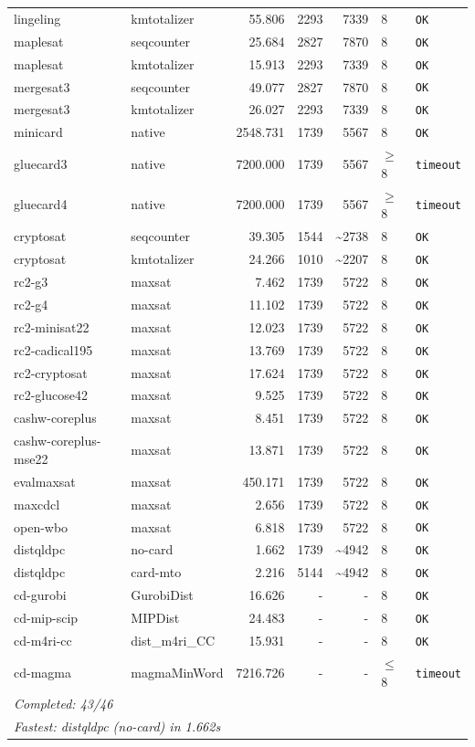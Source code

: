 \begin{longtable}{llrrrl p{}}
lingeling & kmtotalizer & 55.806 & 2293 & 7339 & 8 & \texttt{OK} \\
maplesat & seqcounter & 25.684 & 2827 & 7870 & 8 & \texttt{OK} \\
maplesat & kmtotalizer & 15.913 & 2293 & 7339 & 8 & \texttt{OK} \\
mergesat3 & seqcounter & 49.077 & 2827 & 7870 & 8 & \texttt{OK} \\
mergesat3 & kmtotalizer & 26.027 & 2293 & 7339 & 8 & \texttt{OK} \\
minicard & native & 2548.731 & 1739 & 5567 & 8 & \texttt{OK} \\
gluecard3 & native & 7200.000 & 1739 & 5567 & $\geq$8 & \texttt{timeout} \\
gluecard4 & native & 7200.000 & 1739 & 5567 & $\geq$8 & \texttt{timeout} \\
cryptosat & seqcounter & 39.305 & 1544 & \textasciitilde{}2738 & 8 & \texttt{OK} \\
cryptosat & kmtotalizer & 24.266 & 1010 & \textasciitilde{}2207 & 8 & \texttt{OK} \\
rc2-g3 & maxsat & 7.462 & 1739 & 5722 & 8 & \texttt{OK} \\
rc2-g4 & maxsat & 11.102 & 1739 & 5722 & 8 & \texttt{OK} \\
rc2-minisat22 & maxsat & 12.023 & 1739 & 5722 & 8 & \texttt{OK} \\
rc2-cadical195 & maxsat & 13.769 & 1739 & 5722 & 8 & \texttt{OK} \\
rc2-cryptosat & maxsat & 17.624 & 1739 & 5722 & 8 & \texttt{OK} \\
rc2-glucose42 & maxsat & 9.525 & 1739 & 5722 & 8 & \texttt{OK} \\
cashw-coreplus & maxsat & 8.451 & 1739 & 5722 & 8 & \texttt{OK} \\
cashw-coreplus-mse22 & maxsat & 13.871 & 1739 & 5722 & 8 & \texttt{OK} \\
evalmaxsat & maxsat & 450.171 & 1739 & 5722 & 8 & \texttt{OK} \\
maxcdcl & maxsat & 2.656 & 1739 & 5722 & 8 & \texttt{OK} \\
open-wbo & maxsat & 6.818 & 1739 & 5722 & 8 & \texttt{OK} \\
distqldpc & no-card & 1.662 & 1739 & \textasciitilde{}4942 & 8 & \texttt{OK} \\
distqldpc & card-mto & 2.216 & 5144 & \textasciitilde{}4942 & 8 & \texttt{OK} \\
cd-gurobi & GurobiDist & 16.626 & - & - & 8 & \texttt{OK} \\
cd-mip-scip & MIPDist & 24.483 & - & - & 8 & \texttt{OK} \\
cd-m4ri-cc & dist\_m4ri\_CC & 15.931 & - & - & 8 & \texttt{OK} \\
cd-magma & magmaMinWord & 7216.726 & - & - & $\leq$8 & \texttt{timeout} \\
\midrule
\multicolumn{7}{l}{\textit{Completed: 43/46}} \\
\multicolumn{7}{l}{\textit{Fastest: distqldpc (no-card) in 1.662s}} \\
\end{longtable}
